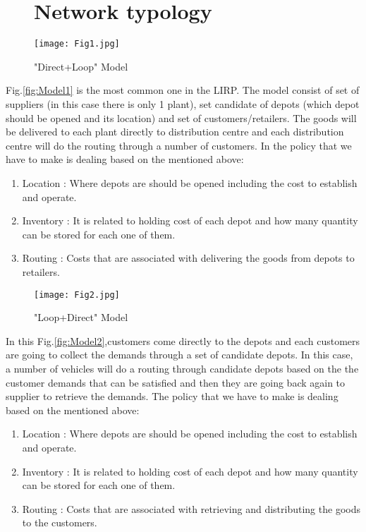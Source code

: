 \documentclass[12pt, a4paper]{article}
\begin{document}
\begin{figure}
\section{Network typology}
\centering
\texttt{[image: Fig1.jpg]}
\caption{"Direct+Loop" Model}\label{fig:Model1}
\end{figure}
\newpage
 Fig.\eqref{fig:Model1} is the most common one in the LIRP. The model consist of set of suppliers (in this case there is only 1 plant), set candidate of depots (which depot should be opened and its location) and set of customers/retailers. The goods will be delivered to each plant directly to distribution centre and each distribution centre will do the routing through a number of customers. In the policy that we have to make is dealing based on the mentioned above: 
\begin{enumerate}
	\item Location : Where depots are should be opened including the cost to establish and operate. 
	\item Inventory : It is related to holding cost of each depot and how many quantity can be stored for each one of them. 
	\item Routing : Costs that are associated with delivering the goods from depots to retailers. 
\end{enumerate}
\begin{figure}
	\centering
	\texttt{[image: Fig2.jpg]}
	\caption{"Loop+Direct" Model}\label{fig:Model2}
\end{figure}
\newpage
In this Fig.\eqref{fig:Model2},customers come directly to the depots and each customers are going to collect the demands through a set of candidate depots. In this case, a number of vehicles will do a routing through candidate depots based on the the customer demands that can be satisfied and then they are going back again to supplier to retrieve the demands. The policy that we have to make is dealing based on the mentioned above: 
\begin{enumerate}
	\item Location : Where depots are should be opened including the cost to establish and operate.
	\item Inventory : It is related to holding cost of each depot and how many quantity can be stored for each one of them.
	\item Routing : Costs that are associated with retrieving and distributing the goods to the customers. 
\end{enumerate}
\end{document}
